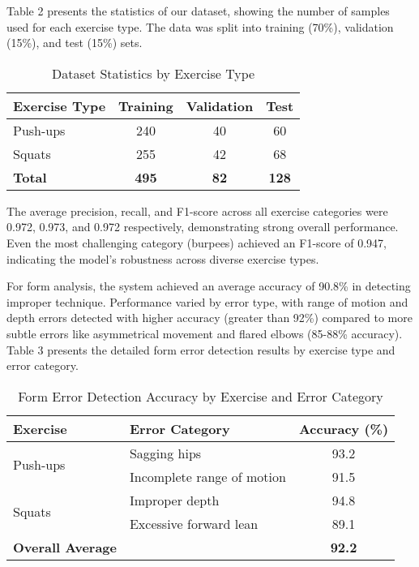 \documentclass[11pt]{article}
\begin{document}
Table 2 presents the statistics of our dataset, showing the number of samples used for each exercise type. The data was split into training (70\%), validation (15\%), and test (15\%) sets.

\begin{table}[h]
\caption{Dataset Statistics by Exercise Type}
\begin{center}
\begin{tabular}{|l|c|c|c|}
\hline
\textbf{Exercise Type} & \textbf{Training} & \textbf{Validation} & \textbf{Test} \\
\hline
Push-ups & 240 & 40 & 60 \\
\hline
Squats & 255 & 42 & 68 \\
\hline
\textbf{Total} & \textbf{495} & \textbf{82} & \textbf{128} \\
\hline
\end{tabular}
\label{tab:dataset}
\end{center}
\end{table}

The average precision, recall, and F1-score across all exercise categories were 0.972, 0.973, and 0.972 respectively, demonstrating strong overall performance. Even the most challenging category (burpees) achieved an F1-score of 0.947, indicating the model's robustness across diverse exercise types.

For form analysis, the system achieved an average accuracy of 90.8\% in detecting improper technique. Performance varied by error type, with range of motion and depth errors detected with higher accuracy (greater than 92\%) compared to more subtle errors like asymmetrical movement and flared elbows (85-88\% accuracy). Table 3 presents the detailed form error detection results by exercise type and error category.

\begin{table}[h]
\caption{Form Error Detection Accuracy by Exercise and Error Category}
\begin{center}
\begin{tabular}{|l|l|c|}
\hline
\textbf{Exercise} & \textbf{Error Category} & \textbf{Accuracy (\%)} \\
\hline
\multirow{2}{*}{Push-ups} & Sagging hips & 93.2 \\
\cline{2-3}
 & Incomplete range of motion & 91.5 \\
\hline
\multirow{2}{*}{Squats} & Improper depth & 94.8 \\
\cline{2-3}
 & Excessive forward lean & 89.1 \\
\hline
\textbf{Overall Average} & & \textbf{92.2} \\
\hline
\end{tabular}
\label{tab:form_accuracy}
\end{center}
\end{table}
\end{document}

